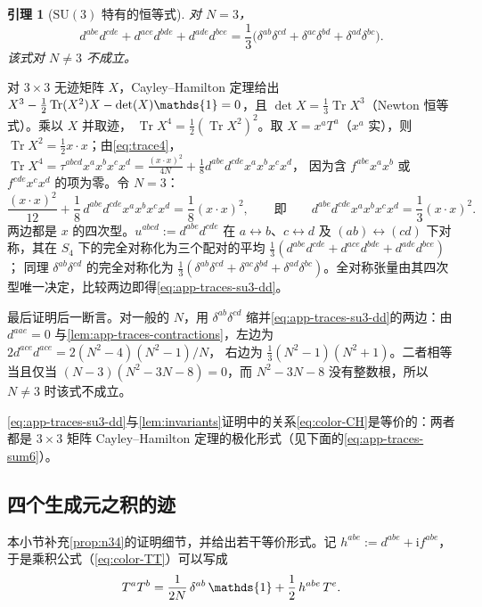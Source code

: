 \documentclass[UTF8,a4paper,11pt,fontset=fandol]{ctexart}
\makeatletter
\let\amsmathbb\mathbb
\renewcommand{\mathbb}[1]{\ifx1#1\mathds{1}\else\amsmathbb{#1}\fi}
\theoremstyle{cplain}
\newtheorem{lemma}[theorem]{引理}
\theoremstyle{cdefinition}
\theoremstyle{cremark}
\renewcommand{\proofname}{证明}
\renewenvironment{proof}[1][\proofname]{\par\pushQED{\qed}\normalfont\topsep6\p@\@plus6\p@\relax
  \trivlist\item[\hskip\labelsep\itshape #1\hspace{0.5em}]\ignorespaces}{\popQED\endtrivlist\@endpefalse}
\numberwithin{equation}{section}
\DeclareMathOperator{\Tr}{Tr}
\newcommand{\ii}{\mathrm{i}}                        %
\makeatother
\begin{document}
\begin{lemma}[$\mathrm{SU}(3)$ 特有的恒等式]\label{lem:app-traces-su3dd}
对 $N=3$，
\begin{equation}\label{eq:app-traces-su3-dd}
d^{abe}d^{cde}+d^{ace}d^{bde}+d^{ade}d^{bce}=\frac13\bigl(\delta^{ab}\delta^{cd}+\delta^{ac}\delta^{bd}+\delta^{ad}\delta^{bc}\bigr).
\end{equation}
该式对 $N\neq3$ 不成立。
\end{lemma}

\begin{proof}
对 $3\times3$ 无迹矩阵 $X$，Cayley--Hamilton 定理给出 $X^3-\frac12\Tr(X^2)X-\det(X)\mathbb 1=0$，且 $\det X=\frac13\Tr X^3$（Newton 恒等式）。乘以 $X$ 并取迹，
$\Tr X^4=\frac12(\Tr X^2)^2$。取 $X=x^aT^a$（$x^a$ 实），则 $\Tr X^2=\frac12x\cdot x$；由\cref{eq:trace4}，$\Tr X^4=\tau^{abcd}x^ax^bx^cx^d=\frac{(x\cdot x)^2}{4N}+\frac18d^{abe}d^{cde}x^ax^bx^cx^d$，
因为含 $f^{abe}x^ax^b$ 或 $f^{cde}x^cx^d$ 的项为零。令 $N=3$：
\[
\frac{(x\cdot x)^2}{12}+\frac18\,d^{abe}d^{cde}x^ax^bx^cx^d=\frac18(x\cdot x)^2,\qquad\text{即}\qquad d^{abe}d^{cde}x^ax^bx^cx^d=\frac13(x\cdot x)^2 .
\]
两边都是 $x$ 的四次型。$u^{abcd}:=d^{abe}d^{cde}$ 在 $a\leftrightarrow b$、$c\leftrightarrow d$ 及 $(ab)\leftrightarrow(cd)$ 下对称，其在 $S_4$ 下的完全对称化为三个配对的平均 $\frac13(d^{abe}d^{cde}+d^{ace}d^{bde}+d^{ade}d^{bce})$；
同理 $\delta^{ab}\delta^{cd}$ 的完全对称化为 $\frac13(\delta^{ab}\delta^{cd}+\delta^{ac}\delta^{bd}+\delta^{ad}\delta^{bc})$。全对称张量由其四次型唯一决定，比较两边即得\cref{eq:app-traces-su3-dd}。

最后证明后一断言。对一般的 $N$，用 $\delta^{ab}\delta^{cd}$ 缩并\cref{eq:app-traces-su3-dd}的两边：由 $d^{aae}=0$ 与\cref{lem:app-traces-contractions}，左边为 $2d^{ace}d^{ace}=2(N^2-4)(N^2-1)/N$，
右边为 $\frac13(N^2-1)(N^2+1)$。二者相等当且仅当 $(N-3)(N^2-3N-8)=0$，而 $N^2-3N-8$ 没有整数根，所以 $N\neq3$ 时该式不成立。
\end{proof}

\cref{eq:app-traces-su3-dd}与\cref{lem:invariants}证明中的关系\cref{eq:color-CH}是等价的：两者都是 $3\times3$ 矩阵 Cayley--Hamilton 定理的极化形式（见下面的\cref{eq:app-traces-sum6}）。

\subsection{四个生成元之积的迹}\label{sec:app-traces-34}

本小节补充\cref{prop:n34}的证明细节，并给出若干等价形式。记 $h^{abe}:=d^{abe}+\ii f^{abe}$，于是乘积公式（\cref{eq:color-TT}）可以写成
\[
T^aT^b=\frac1{2N}\,\delta^{ab}\,\mathbb 1+\frac12\,h^{abe}\,T^e .
\]
\end{document}
